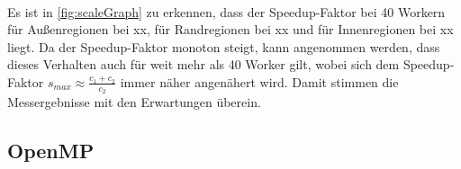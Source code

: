 \\
Es ist in \autoref{fig:scaleGraph} zu erkennen, dass der Speedup-Faktor bei 40 Workern für Außenregionen bei xx, für Randregionen bei xx und für Innenregionen bei xx liegt. Da der Speedup-Faktor monoton steigt, kann angenommen werden, dass dieses Verhalten auch für weit mehr als 40 Worker gilt, wobei sich dem Speedup-Faktor \( s_{max} \approx \frac{c_1 + c_2}{c_2} \) immer näher angenähert wird.
Damit stimmen die Messergebnisse mit den Erwartungen überein.


\subsection{OpenMP}


